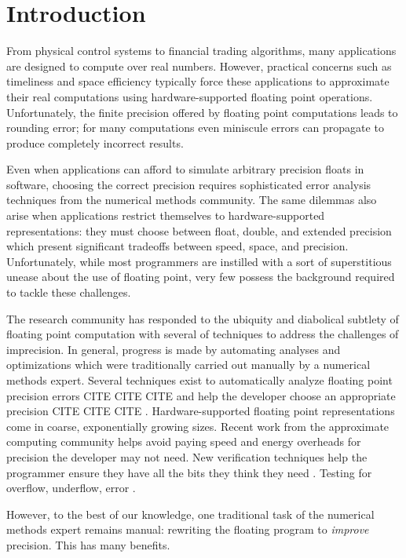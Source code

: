 \documentclass[paper.tex]{subfiles}
\begin{document}
\section{Introduction}
\label{sec:intro}

From physical control systems to financial trading algorithms, many
applications are designed to compute over real numbers.  However,
practical concerns such as timeliness and space efficiency typically
force these applications to approximate their real computations using
hardware-supported floating point operations.  Unfortunately, the
finite precision offered by floating point computations leads to
rounding error; for many computations even miniscule errors can
propagate to produce completely incorrect results.

Even when applications can afford to simulate arbitrary precision
floats in software, choosing the correct precision requires
sophisticated error analysis techniques from the numerical methods
community.  The same dilemmas also arise when applications restrict
themselves to hardware-supported representations: they must choose
between float, double, and extended precision which present
significant tradeoffs between speed, space, and precision.
Unfortunately, while most programmers are instilled with a sort of
superstitious unease about the use of floating point, very few possess
the background required to tackle these challenges.

The research community has responded to the ubiquity and diabolical
subtlety of floating point computation with several of techniques to
address the challenges of imprecision.  In general, progress is made
by automating analyses and optimizations which were traditionally
carried out manually by a numerical methods expert.  Several
techniques exist to automatically analyze floating point precision
errors CITE CITE CITE and help the developer choose an appropriate
precision CITE CITE CITE .  Hardware-supported floating point
representations come in coarse, exponentially growing sizes.  Recent
work from the approximate computing community helps avoid paying speed
and energy overheads for precision the developer may not
need.   New verification techniques help
the programmer ensure they have all the bits they think they need
.  Testing for overflow, underflow, error .

However, to the best of our knowledge, one traditional task of the
numerical methods expert remains manual: rewriting the floating
program to \textit{improve} precision.  This has many benefits.
\end{document}
